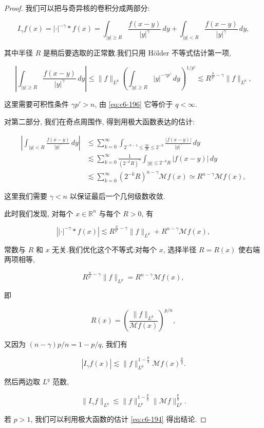 \begin{proof}
我们可以把与奇异核的卷积分成两部分:

\[
I_\gamma f(x) = |\cdot|^{-\gamma}*f(x) = \int_{|y|\ge R}\frac{f(x-y)}{|y|^\gamma}\, dy + \int_{|y|<R}\frac{f(x-y)}{|y|^\gamma}\, dy,
\]

其中半径 $R$ 是稍后要选取的正常数.我们只用 Hölder 不等式估计第一项,

\[
\left|\int_{|y|\ge R}\frac{f(x-y)}{|y|^\gamma}\, dy\right| \le \|f\|_{L^p}\left(\int_{|y|\ge R}|y|^{-\gamma p'}\, dy\right)^{1/p'} \lesssim R^{\frac{n}{p'}-\gamma}\|f\|_{L^p},
\]

这里需要可积性条件 $\gamma p' > n$, 由 \eqref{eq:c6-196} 它等价于 $q<\infty$.

对第二部分, 我们在奇点周围作, 得到用极大函数表达的估计:

\[
\begin{aligned}
\left|\int_{|y|<R}\frac{f(x-y)}{|y|^\gamma}\, dy\right| &\le \sum_{k=0}^\infty\int_{2^{-k-1}\le\frac{|y|}{R}\le 2^{-k}}\frac{|f(x-y)|}{|y|^\gamma}\, dy \\
&\lesssim \sum_{k=0}^\infty\frac{1}{(2^{-k}R)^\gamma}\int_{|y|\le 2^{-k}R}|f(x-y)|\, dy \\
&\lesssim \sum_{k=0}^\infty(2^{-k}R)^{n-\gamma}\mathcal{M}f(x) \simeq R^{n-\gamma}\mathcal{M}f(x),
\end{aligned}
\]

这里我们需要 $\gamma<n$ 以保证最后一个几何级数收敛.

此时我们发现, 对每个 $x\in\mathbb{R}^n$ 与每个 $R>0$, 有

\[
\left||\cdot|^{-\gamma}*f(x)\right| \lesssim R^{\frac{n}{p'}-\gamma}\|f\|_{L^p} + R^{n-\gamma}\mathcal{M}f(x),
\]

常数与 $R$ 和 $x$ 无关.我们优化这个不等式:对每个 $x$, 选择半径 $R = R(x)$ 使右端两项相等,

\[
R^{\frac{n}{p'}-\gamma}\|f\|_{L^p} = R^{n-\gamma}\mathcal{M}f(x),
\]

即

\[
R(x) = \left(\frac{\|f\|_{L^p}}{\mathcal{M}f(x)}\right)^{p/n},
\]

又因为 $(n-\gamma)p/n = 1-p/q$, 我们有

\[
|I_\gamma f(x)| \lesssim \|f\|_{L^p}^{1-\frac{p}{q}}\mathcal{M}f(x)^{\frac{p}{q}}.
\]

然后两边取 $L^q$ 范数,

\[
\|I_\gamma f\|_{L^q} \lesssim \|f\|_{L^p}^{1-\frac{p}{q}}\|\mathcal{M}f\|_{L^p}^{\frac{p}{q}}.
\]

若 $p>1$, 我们可以利用极大函数的估计 \eqref{eq:c6-194} 得出结论.
\end{proof}

